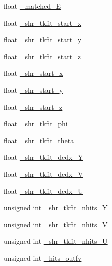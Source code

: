 \begin{DoxyCompactItemize}
\item 
float \hyperlink{classselection_1_1NuMuSelection_a47c185ab6ea19a597c0d049359e851e1}{\-\_\-matched\-\_\-\-E}
\item 
float \hyperlink{classselection_1_1NuMuSelection_a2e7f6e41acd96cb4ff217b1ec129884e}{\-\_\-shr\-\_\-tkfit\-\_\-start\-\_\-x}
\item 
float \hyperlink{classselection_1_1NuMuSelection_aced5ceef2d92e448cfed37ec3fb75ab4}{\-\_\-shr\-\_\-tkfit\-\_\-start\-\_\-y}
\item 
float \hyperlink{classselection_1_1NuMuSelection_a82f756e0a512e9b2ab45a0d2061d2ec3}{\-\_\-shr\-\_\-tkfit\-\_\-start\-\_\-z}
\item 
float \hyperlink{classselection_1_1NuMuSelection_af38dabc2591bc0a81c564db0bb773d2c}{\-\_\-shr\-\_\-start\-\_\-x}
\item 
float \hyperlink{classselection_1_1NuMuSelection_af6c46477cac6efcb513d028e39f707d2}{\-\_\-shr\-\_\-start\-\_\-y}
\item 
float \hyperlink{classselection_1_1NuMuSelection_a9ecc838bf83d8279c7e975aff432f06e}{\-\_\-shr\-\_\-start\-\_\-z}
\item 
float \hyperlink{classselection_1_1NuMuSelection_a82badfd521973f96eb8e2b04d2d768f1}{\-\_\-shr\-\_\-tkfit\-\_\-phi}
\item 
float \hyperlink{classselection_1_1NuMuSelection_a8a3b5a7f7bc6fa4a59fbc36bfbf5a835}{\-\_\-shr\-\_\-tkfit\-\_\-theta}
\item 
float \hyperlink{classselection_1_1NuMuSelection_a1a04003daefae9bb8088709dae0705ca}{\-\_\-shr\-\_\-tkfit\-\_\-dedx\-\_\-\-Y}
\item 
float \hyperlink{classselection_1_1NuMuSelection_a9a054c559dfa6e536562f2e74d2954e0}{\-\_\-shr\-\_\-tkfit\-\_\-dedx\-\_\-\-V}
\item 
float \hyperlink{classselection_1_1NuMuSelection_ab7a3a2abb7bf04a5e3d6a190d1c8c415}{\-\_\-shr\-\_\-tkfit\-\_\-dedx\-\_\-\-U}
\item 
unsigned int \hyperlink{classselection_1_1NuMuSelection_a8104bfe11a01a3afc80e48eebf0b4f1f}{\-\_\-shr\-\_\-tkfit\-\_\-nhits\-\_\-\-Y}
\item 
unsigned int \hyperlink{classselection_1_1NuMuSelection_a089d245ba837cfc077d5f30dd1a309b5}{\-\_\-shr\-\_\-tkfit\-\_\-nhits\-\_\-\-V}
\item 
unsigned int \hyperlink{classselection_1_1NuMuSelection_a49ecf4415ef54632faa2317814210b36}{\-\_\-shr\-\_\-tkfit\-\_\-nhits\-\_\-\-U}
\item 
unsigned int \hyperlink{classselection_1_1NuMuSelection_ac2073c16d1ba83437d9fa66b0aa3ea38}{\-\_\-hits\-\_\-outfv}

\end{DoxyCompactItemize}
